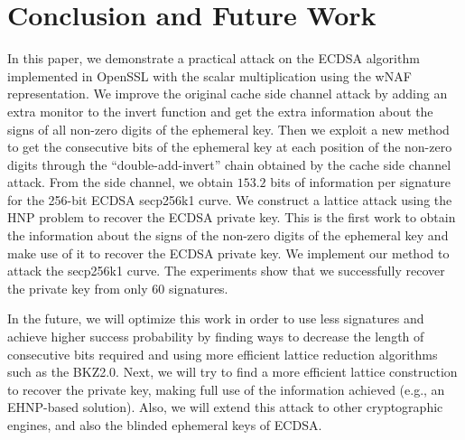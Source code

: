 \section{Conclusion and Future Work}
\label{sec:conclusion}
In this paper, we demonstrate a practical attack on the ECDSA algorithm implemented in OpenSSL with the scalar multiplication using the wNAF representation.
We improve the original cache side channel attack
 by adding an extra monitor to the invert function and get the extra information about the signs of all non-zero digits of the ephemeral key.
Then we exploit a new method to get the consecutive bits of the ephemeral key at each position of the non-zero digits through the ``double-add-invert'' chain obtained by the cache side channel attack.
From the side channel, we obtain $153.2$ bits of information per signature for the 256-bit ECDSA secp256k1 curve.
We construct a lattice attack using the HNP problem to recover the ECDSA private key.
This is the first work to obtain the information about the signs of the non-zero digits of the ephemeral key and make use of it to recover the ECDSA private key.
We implement our method to attack the secp256k1 curve.
The experiments show that we successfully recover the private key from only $60$ signatures.

In the future, 
we will optimize this work in order to use less signatures and achieve higher success probability by finding ways to decrease the length of consecutive bits required and using more efficient lattice reduction algorithms such as the BKZ2.0. 
Next, we will try to find a more efficient lattice construction to recover the private key,
    making full use of the information achieved (e.g., an EHNP-based solution).
Also, we will extend this attack to other cryptographic engines,
    and also the blinded ephemeral keys of ECDSA.


